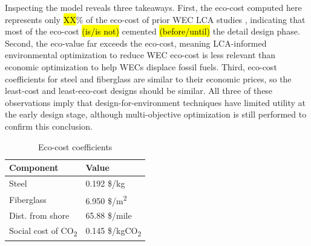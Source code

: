 \documentclass[10pt,twoside]{article}
\begin{document}
Inspecting the model reveals three takeaways.
First, the eco-cost computed here represents only \hl{XX}\% of the eco-cost of prior WEC LCA studies \cite{pennock_life_2022}, indicating that most of the eco-cost \hl{(is/is not)} cemented \hl{(before/until)} the detail design phase.
Second, the eco-value far exceeds the eco-cost, meaning LCA-informed environmental optimization to reduce WEC eco-cost is less relevant than economic optimization to help WECs displace fossil fuels.
Third, eco-cost coefficients for steel and fiberglass are similar to their economic prices, so the least-cost and least-eco-cost designs should be similar.
All three of these observations imply that design-for-environment techniques have limited utility at the early design stage, although multi-objective optimization is still performed to confirm this conclusion.
\begin{minipage}[b]{0.34\textwidth}
    \begin{table}[H]
    \begin{tabular}{ ll } 
        \hline
        Component & Value \\ 
        \hline
        Steel & 0.192 \$/kg \\ 
        Fiberglass & 6.950 \$/m\textsuperscript{2} \\ 
        Dist. from shore & 65.88 \$/mile \\ 
        Social cost of CO\textsubscript{2} & 0.145 \$/kgCO\textsubscript{2} \\
    \end{tabular}
    \caption{Eco-cost coefficients}
    \label{tab:lca-weights}
    \end{table}
\end{minipage}
\end{document}

